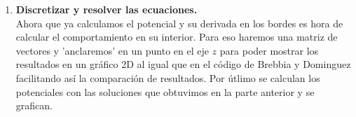 \begin{enumerate}
{Generación y resolución del sistema lineal: }Una vez que se tiene definido todo lo anterior se procede a definir el lado izquiero y derecho de la ecuación del problema, el cual posteriormente será resuelto usando $gmres$ al igual que el código anterior.
\item \textbf{Discretizar y resolver las ecuaciones.}\\
Ahora que ya calculamos el potencial y su derivada en los bordes es hora de calcular el comportamiento en su interior. Para eso haremos una matriz de vectores y 'anclaremos' en un punto en el eje $z$ para poder mostrar los resultados en un gráfico 2D al igual que en el código de Brebbia y Dominguez facilitando así la comparación de resultados.
Por útlimo se calculan los potenciales con las soluciones que obtuvimos en la parte anterior y se grafican.
\end{enumerate}